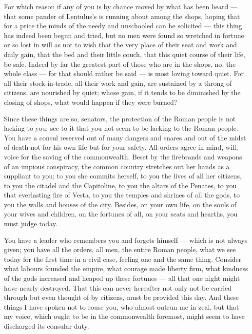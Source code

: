  For which reason if any of you is by chance moved by what has been heard --- that some pander of Lentulus's is running about among the shops, hoping that for a price the minds of the needy and unschooled can be solicited --- this thing has indeed been begun and tried, but no men were found so wretched in fortune or so lost in will as not to wish that the very place of their seat and work and daily gain, that the bed and their little couch, that this quiet course of their life, be safe. Indeed by far the greatest part of those who are in the shops, no, the whole class --- for that should rather be said --- is most loving toward quiet. For all their stock-in-trade, all their work and gain, are sustained by a throng of citizens, are nourished by quiet; whose gain, if it tends to be diminished by the closing of shops, what would happen if they were burned?

 Since these things are so, senators, the protection of the Roman people is not lacking to you: see to it that you not seem to be lacking to the Roman people. You have a consul reserved out of many dangers and snares and out of the midst of death not for his own life but for your safety. All orders agree in mind, will, voice for the saving of the commonwealth. Beset by the firebrands and weapons of an impious conspiracy, the common country stretches out her hands as a suppliant to you; to you she commits herself, to you the lives of all her citizens, to you the citadel and the Capitoline, to you the altars of the Penates, to you that everlasting fire of Vesta, to you the temples and shrines of all the gods, to you the walls and houses of the city. Besides, on your own life, on the souls of your wives and children, on the fortunes of all, on your seats and hearths, you must judge today.

 You have a leader who remembers you and forgets himself --- which is not always given; you have all the orders, all men, the entire Roman people, what we see today for the first time in a civil case, feeling one and the same thing. Consider what labours founded the empire, what courage made liberty firm, what kindness of the gods increased and heaped up these fortunes --- all that one night might have nearly destroyed. That this can never hereafter not only not be carried through but even thought of by citizens, must be provided this day. And these things I have spoken not to rouse you, who almost outrun me in zeal, but that my voice, which ought to be in the commonwealth foremost, might seem to have discharged its consular duty.

